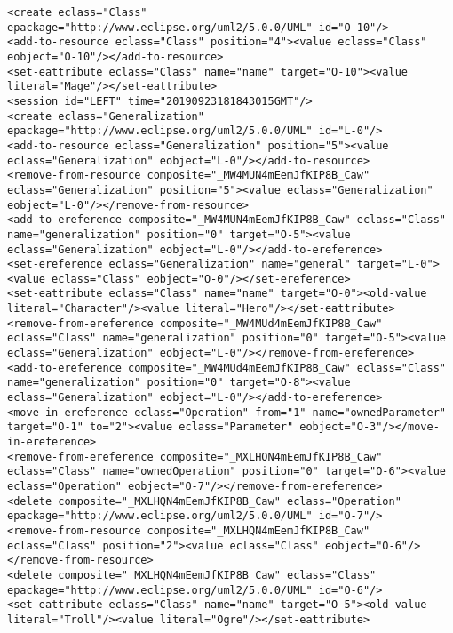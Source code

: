 \begin{lstlisting}[style=cbpfile,caption={Change-based representation of the model in Figure \ref{fig:class_diagram_left}.},label=lst:class_diagram_left_cbpfile]
<create eclass="Class" epackage="http://www.eclipse.org/uml2/5.0.0/UML" id="O-10"/>
<add-to-resource eclass="Class" position="4"><value eclass="Class" eobject="O-10"/></add-to-resource>
<set-eattribute eclass="Class" name="name" target="O-10"><value literal="Mage"/></set-eattribute>
<session id="LEFT" time="20190923181843015GMT"/>
<create eclass="Generalization" epackage="http://www.eclipse.org/uml2/5.0.0/UML" id="L-0"/>
<add-to-resource eclass="Generalization" position="5"><value eclass="Generalization" eobject="L-0"/></add-to-resource>
<remove-from-resource composite="_MW4MUN4mEemJfKIP8B_Caw" eclass="Generalization" position="5"><value eclass="Generalization" eobject="L-0"/></remove-from-resource>
<add-to-ereference composite="_MW4MUN4mEemJfKIP8B_Caw" eclass="Class" name="generalization" position="0" target="O-5"><value eclass="Generalization" eobject="L-0"/></add-to-ereference>
<set-ereference eclass="Generalization" name="general" target="L-0"><value eclass="Class" eobject="O-0"/></set-ereference>
<set-eattribute eclass="Class" name="name" target="O-0"><old-value literal="Character"/><value literal="Hero"/></set-eattribute>
<remove-from-ereference composite="_MW4MUd4mEemJfKIP8B_Caw" eclass="Class" name="generalization" position="0" target="O-5"><value eclass="Generalization" eobject="L-0"/></remove-from-ereference>
<add-to-ereference composite="_MW4MUd4mEemJfKIP8B_Caw" eclass="Class" name="generalization" position="0" target="O-8"><value eclass="Generalization" eobject="L-0"/></add-to-ereference>
<move-in-ereference eclass="Operation" from="1" name="ownedParameter" target="O-1" to="2"><value eclass="Parameter" eobject="O-3"/></move-in-ereference>
<remove-from-ereference composite="_MXLHQN4mEemJfKIP8B_Caw" eclass="Class" name="ownedOperation" position="0" target="O-6"><value eclass="Operation" eobject="O-7"/></remove-from-ereference>
<delete composite="_MXLHQN4mEemJfKIP8B_Caw" eclass="Operation" epackage="http://www.eclipse.org/uml2/5.0.0/UML" id="O-7"/>
<remove-from-resource composite="_MXLHQN4mEemJfKIP8B_Caw" eclass="Class" position="2"><value eclass="Class" eobject="O-6"/></remove-from-resource>
<delete composite="_MXLHQN4mEemJfKIP8B_Caw" eclass="Class" epackage="http://www.eclipse.org/uml2/5.0.0/UML" id="O-6"/>
<set-eattribute eclass="Class" name="name" target="O-5"><old-value literal="Troll"/><value literal="Ogre"/></set-eattribute>

\end{lstlisting}
